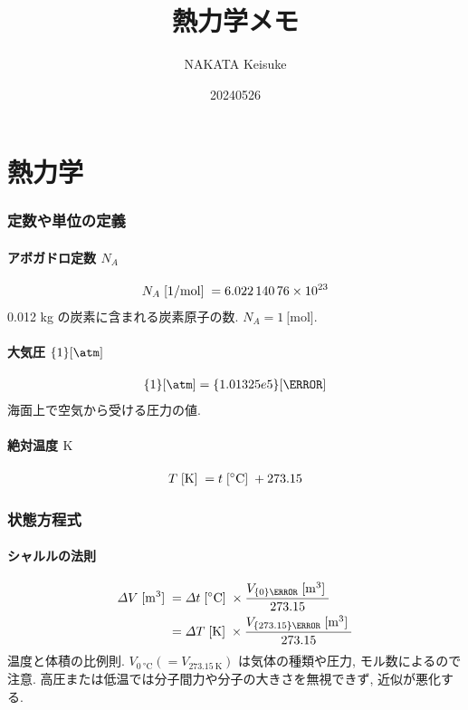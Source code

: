 \documentclass[a4paper,11pt]{jsarticle}
\newcommand{\braunit}[1]{\;\text{[}\unit[per-mode = symbol]{#1}\text{]}\;}
\begin{document}
\title{熱力学メモ}
\author{NAKATA Keisuke}
\date{20240526}
\maketitle


\part*{熱力学}

\section{定数や単位の定義}

\subsection{アボガドロ定数 \texorpdfstring{$N_A$}{N\_A}}
\begin{align*}
  N_A \braunit{\per\mol}= \num{6.02214076e23}
\end{align*}
0.012 kg の炭素に含まれる炭素原子の数. $N_A = \qty{1}{[\mol]}$.
\cite[pp.1]{thermo}

\subsection{大気圧 \texorpdfstring{$\qty{1}{[\atm]}$}{1[atm]}}
\begin{align*}
  \qty{1}{[\atm]} = \qty{1.01325e5}{[\Pa]}
\end{align*}
海面上で空気から受ける圧力の値.
\cite[pp.1]{thermo}

\subsection{絶対温度 \texorpdfstring{$\unit{\K}$}{K}}
\begin{align*}
  T \braunit{\K} = t \braunit{\celsius} + 273.15
\end{align*}
\cite[pp.10]{thermo}

\section{状態方程式}

\subsection{シャルルの法則}
\begin{align*}
  \varDelta V\braunit{\m^3}
    &= \varDelta t\braunit{\celsius}\times\frac{V_{\qty{0}{\celsius}}\braunit{\m^3}}{273.15} \\
    &= \varDelta T\braunit{\K}\times\frac{V_{\qty{273.15}{\K}}\braunit{\m^3}}{273.15}
\end{align*}
温度と体積の比例則. $V_{\qty{0}{\celsius}} (=V_{\qty{273.15}{\K}})$ は気体の種類や圧力, モル数によるので注意. 高圧または低温では分子間力や分子の大きさを無視できず, 近似が悪化する.
\cite[pp.10]{thermo}
\end{document}
